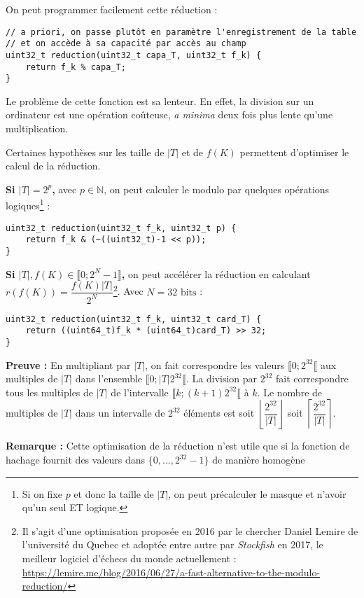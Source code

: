 \documentclass[../../../main.tex]{subfiles}
\begin{document}
On peut programmer facilement cette réduction :
\begin{verbatim}
// a priori, on passe plutôt en paramètre l'enregistrement de la table
// et on accède à sa capacité par accès au champ
uint32_t reduction(uint32_t capa_T, uint32_t f_k) {
	return f_k % capa_T;
}
\end{verbatim}
Le problème de cette fonction est sa lenteur. En effet, la division sur un ordinateur est une opération coûteuse, \textit{a minima} deux fois plus lente qu'une multiplication.

Certaines hypothèses sur les taille de $|T|$ et de $f(K)$ permettent d'optimiser le calcul de la réduction. 

\textbf{Si $|T| = 2^p$,} avec $p\in\mathbb{N}$, on peut calculer le modulo par quelques opérations logiques\footnote{Si on fixe $p$ et donc la taille de $|T|$, on peut précalculer le masque et n'avoir qu'un seul ET logique.} :
\begin{verbatim}
uint32_t reduction(uint32_t f_k, uint32_t p) {
	return f_k & (~((uint32_t)-1 << p));
}
\end{verbatim}

\textbf{Si $|T|, f(K)\in\llbracket 0; 2^N - 1\rrbracket$,} on peut accélérer la réduction en calculant $r(f(K)) = \dfrac{f(K)|T|}{2^N}$\footnote{Il s'agit d'une optimisation proposée en 2016 par le chercher Daniel Lemire de l'université du Quebec et adoptée entre autre par \textit{Stockfish} en 2017, le meilleur logiciel d'échecs du monde actuellement : \url{https://lemire.me/blog/2016/06/27/a-fast-alternative-to-the-modulo-reduction/}}. Avec $N = 32\text{ bits}$ :
\begin{verbatim}
uint32_t reduction(uint32_t f_k, uint32_t card_T) {
	return ((uint64_t)f_k * (uint64_t)card_T) >> 32;
}
\end{verbatim}
\textbf{Preuve :} En multipliant par $|T|$, on fait correspondre les valeurs $\llbracket 0; 2^{32}\llbracket$ aux multiples de $|T|$ dans l'ensemble $\llbracket 0; |T|2^{32}\llbracket$. La division par $2^{32}$ fait correspondre tous les multiples de $|T|$ de l'intervalle $\llbracket k; (k+1)2^{32}\llbracket$ à $k$. Le nombre de multiples de $|T|$ dans un intervalle de $2^{32}$ éléments est soit $\left\lfloor \dfrac{2^{32}}{|T|}\right\rfloor$ soit $\left\lceil \dfrac{2^{32}}{|T|}\right\rceil$.

\textbf{Remarque :} Cette optimisation de la réduction n'est utile que si la fonction de hachage fournit des valeurs dans $\{0, \dots, 2^{32}-1\}$ de manière homogène
\end{document}
